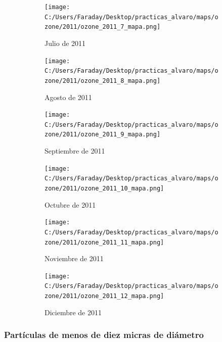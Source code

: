 \documentclass[12pt]{article}
\begin{document}
\newpage

\begin{figure}[H]
\centering
\begin{subfigure}[h]{0.45\textwidth}
\texttt{[image: C:/Users/Faraday/Desktop/practicas\_alvaro/maps/ozone/2011/ozone\_2011\_7\_mapa.png]}
\caption{Julio de 2011}
\label{fig:map-mon-2-7-2011}
\end{subfigure}
%
\begin{subfigure}[H]{0.45\textwidth}
\texttt{[image: C:/Users/Faraday/Desktop/practicas\_alvaro/maps/ozone/2011/ozone\_2011\_8\_mapa.png]}
\caption{Agosto de 2011}
\label{fig:map-mon-2-8-2011}
\end{subfigure}
\caption{}
\end{figure}

\begin{figure}[H]
\centering
\begin{subfigure}[h]{0.45\textwidth}
\texttt{[image: C:/Users/Faraday/Desktop/practicas\_alvaro/maps/ozone/2011/ozone\_2011\_9\_mapa.png]}
\caption{Septiembre de 2011}
\label{fig:map-mon-2-9-2011}
\end{subfigure}
%
\begin{subfigure}[H]{0.45\textwidth}
\texttt{[image: C:/Users/Faraday/Desktop/practicas\_alvaro/maps/ozone/2011/ozone\_2011\_10\_mapa.png]}
\caption{Octubre de 2011}
\label{fig:map-mon-2-10-2011}
\end{subfigure}
\caption{}
\end{figure}

\begin{figure}[H]
\centering
\begin{subfigure}[h]{0.45\textwidth}
\texttt{[image: C:/Users/Faraday/Desktop/practicas\_alvaro/maps/ozone/2011/ozone\_2011\_11\_mapa.png]}
\caption{Noviembre de 2011}
\label{fig:map-mon-2-11-2011}
\end{subfigure}
%
\begin{subfigure}[H]{0.45\textwidth}
\texttt{[image: C:/Users/Faraday/Desktop/practicas\_alvaro/maps/ozone/2011/ozone\_2011\_12\_mapa.png]}
\caption{Diciembre de 2011}
\label{fig:map-mon-2-12-2011}
\end{subfigure}
\caption{}
\end{figure}

\newpage

\subsubsection*{Partículas de menos de diez micras de diámetro}
%
\end{document}
